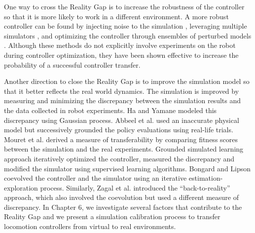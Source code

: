 One way to cross the Reality Gap is to increase the robustness of the controller so that it is more likely to work in a different environment. A more robust controller can be found by injecting noise to the simulation \cite{Miglino94,Jakobi95,Miglino96}, leveraging multiple simulators \cite{Boeing:2012}, and optimizing the controller through ensembles of perturbed models \cite{Mordatch:2015}. Although these methods do not explicitly involve experiments on the robot during controller optimization, they have been shown effective to increase the probability of a successful controller transfer.

Another direction to close the Reality Gap is to improve the simulation model so that it better reflects the real world dynamics. The simulation is improved by measuring and minimizing the discrepancy between the simulation results and the data collected in robot experiments. Ha and Yamane \cite{HA:2015} modeled this discrepancy using Gaussian process. Abbeel et al. \cite{Abbeel:2006} used an inaccurate physical model but successively grounded the policy evaluations using real-life trials. Mouret et al. \cite{MouretKD13, Koos:2010} derived a measure of transferability by comparing fitness scores between the simulation and the real experiments. Grounded simulated learning approach \cite{Farchy:2013} iteratively optimized the controller, measured the discrepancy and modified the simulator using supervised learning algorithms. Bongard and Lipson \cite{BongardL05} coevolved the controller and the simulator using an iterative estimation-exploration process. Similarly, Zagal et al. \cite{zagal2004} introduced the ``back-to-reality'' approach, which also involved the coevolution but used a different measure of discrepancy. In Chapter 6, we investigate several factors that contribute to the Reality Gap and we present a simulation calibration process to transfer locomotion controllers from virtual to real environments.
